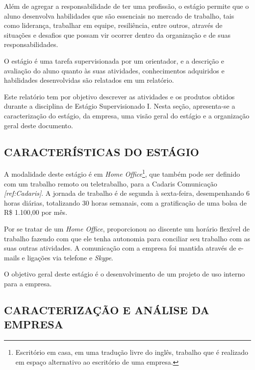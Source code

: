 \documentclass[
  12pt,				%
  openany,
  oneside,
  a4paper,			%
  english,			%
  brazil
]{article}
\numberwithin{figure}{section}
\numberwithin{table}{section}
\begin{document}
Além de agregar a responsabilidade de ter uma profissão, o estágio permite que o aluno desenvolva habilidades que são essenciais no mercado de trabalho, tais como liderança, trabalhar em equipe, resiliência, entre outros, através de situações e desafios que possam vir ocorrer dentro da organização e de suas responsabilidades.

O estágio é uma tarefa supervisionada por um orientador, e a descrição e avaliação do aluno quanto às suas atividades, conhecimentos adquiridos e habilidades desenvolvidas são relatados em um relatório.

Este relatório tem por objetivo descrever as atividades e os produtos obtidos durante a disciplina de Estágio Supervisionado I. Nesta seção, apresenta-se a caracterização do estágio, da empresa, uma visão geral do estágio e a organização geral deste documento.



\subsection{CARACTERÍSTICAS DO ESTÁGIO}

A modalidade deste estágio é em \textit{Home Office}\footnote{Escritório em casa, em uma tradução livre do inglês, trabalho que é realizado em espaço alternativo ao escritório de uma empresa.}, que também pode ser definido com um trabalho remoto ou teletrabalho, para a Cadaris Comunicação \textit{[ref:Cadaris]}. A jornada de trabalho é de segunda à sexta-feira, desempenhando 6 horas diárias, totalizando 30 horas semanais, com a gratificação de uma bolsa de R\$ 1.100,00 por mês.

Por se tratar de um \textit{Home Office}, proporcionou ao discente um horário flexível de trabalho fazendo com que ele tenha autonomia para conciliar seu trabalho com as suas outras atividades. A comunicação com a empresa foi mantida através de e-mails e ligações via telefone e \textit{Skype}.

O objetivo geral deste estágio é o desenvolvimento de um projeto de uso interno para a empresa.




\subsection{CARACTERIZAÇÃO E ANÁLISE DA EMPRESA}

\end{document}
